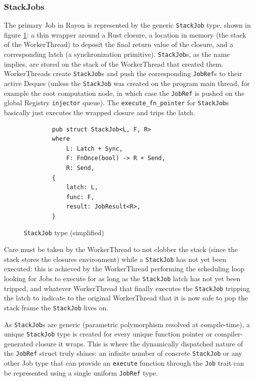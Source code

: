 \documentclass[bsc,frontabs,singlespacing,parskip,deptreport,normalheadings]{infthesis}
\begin{document}
\subsubsection*{StackJobs}

The primary Job in Rayon is represented by the generic \texttt{StackJob} type,
shown in figure \ref{fig:stackjob}: a thin wrapper around a Rust closure, a
location in memory (the stack of the WorkerThread) to deposit the final return
value of the closure, and a corresponding latch (a synchronization primitive).
\texttt{StackJob}s, as the name implies, are stored on the stack of the
WorkerThread that created them. WorkerThreads create \texttt{StackJob}s and push
the corresponding \texttt{JobRef}s to their active Deques (unless the
\texttt{StackJob} was created on the program main thread, for example the root
computation node, in which case the \texttt{JobRef} is pushed on the global
Registry \texttt{injector} queue). The \texttt{execute\_fn\_pointer} for
\texttt{StackJob}s basically just executes the wrapped closure and trips the
latch.

\begin{figure}[ht]
    \begin{verbatim}
        pub struct StackJob<L, F, R>
        where
            L: Latch + Sync,
            F: FnOnce(bool) -> R + Send,
            R: Send,
        {
            latch: L,
            func: F,
            result: JobResult<R>,
        }
    \end{verbatim}
    \caption{\texttt{StackJob} type (simplified)}
    \label{fig:stackjob}
\end{figure}

Care must be taken by the WorkerThread to not clobber the stack (since the stack
stores the closures environment) while a \texttt{StackJob} has not yet been
executed: this is achieved by the WorkerThread performing the scheduling loop
looking for Jobs to execute for as long as the \texttt{StackJob} latch has not
yet been tripped, and whatever WorkerThread that finally executes the
\texttt{StackJob} tripping the latch to indicate to the original WorkerThread
that it is now safe to pop the stack frame the \texttt{StackJob} lives on.

As \texttt{StackJob}s are generic (parametric polymorphism resolved at
compile-time), a unique \texttt{StackJob} type is created for every unique
function pointer or compiler-generated closure it wraps. This is where the
dynamically dispatched nature of the \texttt{JobRef} struct truly shines: an
infinite number of concrete \texttt{StackJob} or any other Job type that can
provide an \texttt{execute} function through the \texttt{Job} trait can be
represented using a single uniform \texttt{JobRef} type.
\end{document}
